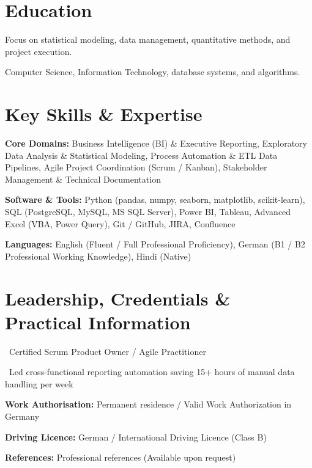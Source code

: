 \documentclass[10pt,a4paper]{article}
\begin{document}
\section*{Education}


{\small Focus on statistical modeling, data management, quantitative methods, and project execution.}\par



{\small Computer Science, Information Technology, database systems, and algorithms.}\par



\section*{Key Skills \& Expertise}
\textbf{Core Domains:} Business Intelligence (BI) \& Executive Reporting, Exploratory Data Analysis \& Statistical Modeling, Process Automation \& ETL Data Pipelines, Agile Project Coordination (Scrum / Kanban), Stakeholder Management \& Technical Documentation\par

\textbf{Software \& Tools:} Python (pandas, numpy, seaborn, matplotlib, scikit-learn), SQL (PostgreSQL, MySQL, MS SQL Server), Power BI, Tableau, Advanced Excel (VBA, Power Query), Git / GitHub, JIRA, Confluence\par
\textbf{Languages:} English (Fluent / Full Professional Proficiency), German (B1 / B2 Professional Working Knowledge), Hindi (Native)


\section*{Leadership, Credentials \& Practical Information}

\textbullet\ Certified Scrum Product Owner / Agile Practitioner\par

\textbullet\ Led cross-functional reporting automation saving 15+ hours of manual data handling per week\par

\textbf{Work Authorisation:} Permanent residence / Valid Work Authorization in Germany\par

\textbf{Driving Licence:} German / International Driving Licence (Class B)\par


\textbf{References:} Professional references (Available upon request)
\end{document}

